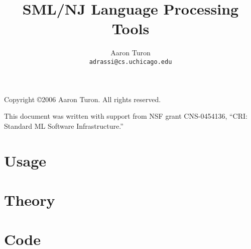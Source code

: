 \documentclass[11pt]{book}
\title{SML/NJ Language Processing Tools}
\author{Aaron Turon\\
\texttt{adrassi@cs.uchicago.edu}}
\date{ }
\newcommand{\parttext}{}
\newcommand{\cpart}[1]{\renewcommand{\parttext}{#1}\part{#1}}
\begin{document}
\frontmatter

	\maketitle
	
	\phantom{.}
	
	\noindent Copyright \copyright{}2006 Aaron Turon.  All rights reserved.
	
	\vskip 12pt
	\noindent This document was written with support from NSF grant CNS-0454136, ``CRI: Standard ML Software Infrastructure.''
	
	\pagebreak
	
	\tableofcontents

\mainmatter

	\cpart{Usage}
	
		
		
	
	\cpart{Theory}
	
		
		

	\cpart{Code}

		
		

\backmatter

	
	
\end{document}
